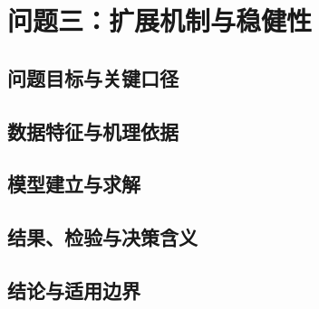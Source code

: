 \SectionStart
\section{问题三：扩展机制与稳健性}
\subsection{问题目标与关键口径}
\subsection{数据特征与机理依据}
\subsection{模型建立与求解}
\subsection{结果、检验与决策含义}
\subsection{结论与适用边界}

